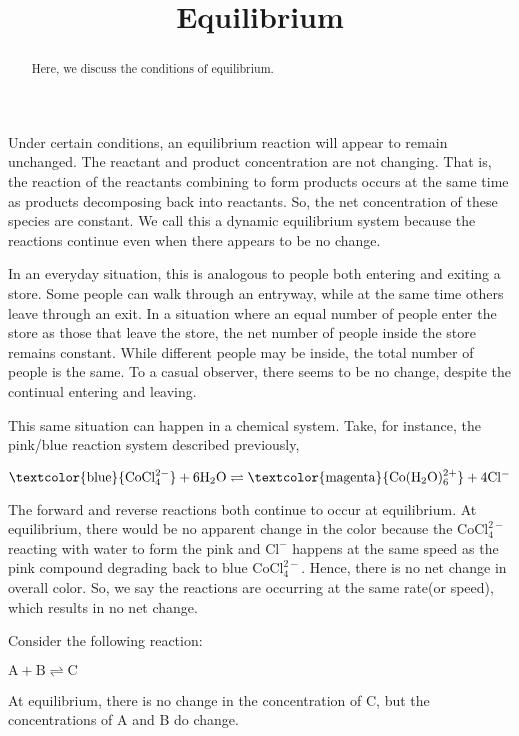 \documentclass{ximera}
\title{Equilibrium}
\begin{document}
\begin{abstract}
Here, we discuss the conditions of equilibrium.
\end{abstract}
\maketitle


Under certain conditions, an equilibrium reaction will appear to remain unchanged.  The reactant and product concentration are not changing. That is, the reaction of the reactants combining to form products occurs at the same time as products decomposing back into reactants. So, the net concentration of these species are constant. We call this a dynamic equilibrium system because the reactions continue even when there appears to be no change. 

In an everyday situation, this is analogous to people both entering and exiting a store. Some people can walk through an entryway, while at the same time others leave through an exit. In a situation where an equal number of people enter the store as those that leave the store, the net number of people inside the store remains constant. While different people may be inside, the total number of people is the same. To a casual observer, there seems to be no change, despite the continual entering and leaving. 

This same situation can happen in a chemical system. Take, for instance, the pink/blue reaction system described previously,

%
%
     $\mathrm{\textcolor{blue}{CoCl_{4}^{ 2-}}+ 6H_2O  \rightleftharpoons \textcolor{magenta}{Co(H_2O)_6^{ 2+}} + 4Cl^-}$


The forward and reverse reactions both continue to occur at equilibrium. At equilibrium, there would be no apparent change in the color because the 
$\mathrm{CoCl_{4}^{ 2-}}$ reacting with water to form the pink and $\mathrm{Cl^-}$ happens at the same speed as the pink compound degrading back to blue 
$\mathrm{CoCl_4^{2-}}$. Hence, there is no net change in overall color. So, we say the reactions are occurring at the same rate(or speed), which results in no net change.

\begin{question}
Consider the following reaction:

$\mathrm{A+B \rightleftharpoons C}$


At equilibrium, there is no change in the concentration of C, but the concentrations of A and B do change.

 \begin{multipleChoice}
\end{multipleChoice}
\end{question}
\end{document}
